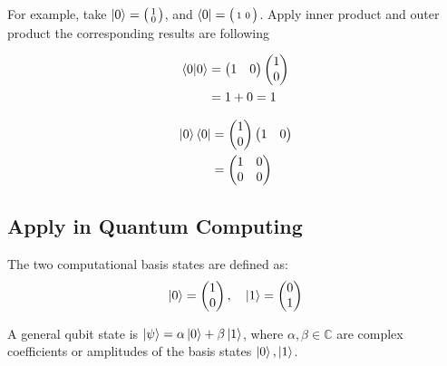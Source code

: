 \documentclass[11pt]{article}
\begin{document}
    For example, take $\ket{0} = \bigl( \begin{smallmatrix} 1 \\ 0 \end{smallmatrix} \bigr)$, and $\bra{0} = \bigl( \begin{smallmatrix} 1 & 0 \end{smallmatrix} \bigr) $.
    Apply inner product and outer product the corresponding results are following

    \begin{align*}
        \braket{0|0} &= \begin{pmatrix} 1 & 0 \end{pmatrix} \begin{pmatrix} 1 \\ 0 \end{pmatrix} \\
        &= 1 + 0 = 1
    \end{align*}

    \begin{align*}
        \ket{0}\bra{0} &= \begin{pmatrix} 1 \\ 0 \end{pmatrix} \begin{pmatrix} 1 & 0 \end{pmatrix} \\
        &= \begin{pmatrix} 1 & 0 \\ 0 & 0 \end{pmatrix}
    \end{align*}

    \subsection{Apply in Quantum Computing}\label{subsec:apply-in-quantum-computing}

    The two computational basis states are defined as:
    \[
        \ket{0} = \begin{pmatrix} 1 \\ 0 \end{pmatrix}, \quad \ket{1} = \begin{pmatrix} 0 \\ 1 \end{pmatrix}
    \]

    A general qubit state is $\ket{\psi} = \alpha\ket{0} + \beta\ket{1}$, where $\alpha, \beta \in \mathbb{C}$ are complex coefficients or amplitudes of the basis states $\ket{0}, \ket{1}$.
\end{document}
